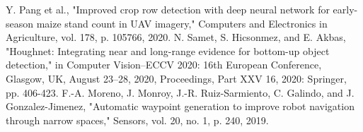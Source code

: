 \documentclass[conference]{IEEEtran}
\begin{document}
\begin{thebibliography}{00}
 Y. Pang et al., "Improved crop row detection with deep neural network for early-season maize stand count in UAV imagery," Computers and Electronics in Agriculture, vol. 178, p. 105766, 2020.
 N. Samet, S. Hicsonmez, and E. Akbas, "Houghnet: Integrating near and long-range evidence for bottom-up object detection," in Computer Vision–ECCV 2020: 16th European Conference, Glasgow, UK, August 23–28, 2020, Proceedings, Part XXV 16, 2020: Springer, pp. 406-423.
 F.-A. Moreno, J. Monroy, J.-R. Ruiz-Sarmiento, C. Galindo, and J. Gonzalez-Jimenez, "Automatic waypoint generation to improve robot navigation through narrow spaces," Sensors, vol. 20, no. 1, p. 240, 2019.
\end{thebibliography}

\vspace{12pt}
\end{document}
